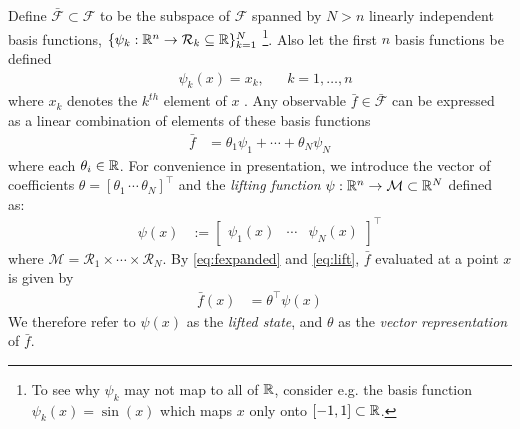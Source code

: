 Define ${\bar{\mathcal{F}} \subset \mathcal{F}}$ to be the subspace of $\mathcal{F}$ spanned by ${N>n}$ linearly independent basis functions, 
${ \{ \psi_k : \mathbb{R}^n \to \mathcal{R}_k \subseteq \mathbb{R} \}_{k=1}^N}$ 
\footnote{To see why $\psi_k$ may not map to all of $\mathbb{R}$, consider e.g. the basis function $\psi_k(x) = \sin{(x)}$ which maps $x$ only onto $[-1,1] \subset \mathbb{R}$.}.
Also let the first $n$ basis functions be defined
\begin{align}
    &\psi_k(x) = x_k , && k = 1, \dots , n
    \label{eq:xinpsi}
\end{align}
where $x_k$ denotes the $k^{th}$ element of $x$ .
Any observable $\bar{f} \in \bar{\mathcal{F}}$ can be expressed as a linear combination of elements of these basis functions
\begin{align}
    \bar{f} &= \theta_1 \psi_1 + \cdots + \theta_N \psi_N
    \label{eq:fexpanded}
\end{align}
where each $\theta_i \in \mathbb{R}$.
For convenience in presentation, we introduce the vector of coefficients ${\theta = [ \theta_1 \,  \cdots \, \theta_N ]^\top}$ and the \emph{lifting function} ${\psi : \mathbb{R}^n \to \mathcal{M} \subset \mathbb{R}^N}$ defined as:
\begin{align}
    \psi(x) &:= \begin{bmatrix} \psi_1 (x) & \cdots & \psi_N (x) \end{bmatrix}^\top
    \label{eq:lift}
\end{align}
where $\mathcal{M} = \mathcal{R}_1 \times \cdots \times \mathcal{R}_N$.
By \eqref{eq:fexpanded} and \eqref{eq:lift}, $\bar{f}$ evaluated at a point $x$ is given by
\begin{align}
    \bar{f}(x) &= \theta^\top \psi (x)
    \label{eq:fvec}
\end{align}
We therefore refer to $\psi(x)$ as the \emph{lifted state}, and $\theta$ as the \emph{vector representation} of $\bar{f}$.

